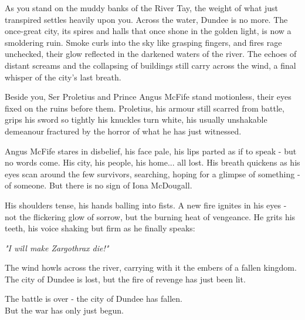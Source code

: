 \begin{DndReadAloud}
	As you stand on the muddy banks of the River Tay, the weight of what just transpired settles heavily upon you. Across the water, Dundee is no more. The once-great city, its spires and halls that once shone in the golden light, is now a smoldering ruin. Smoke curls into the sky like grasping fingers, and fires rage unchecked, their glow reflected in the darkened waters of the river. The echoes of distant screams and the collapsing of buildings still carry across the wind, a final whisper of the city's last breath.

	Beside you, Ser Proletius and Prince Angus McFife stand motionless, their eyes fixed on the ruins before them. Proletius, his armour still scarred from battle, grips his sword so tightly his knuckles turn white, his usually unshakable demeanour fractured by the horror of what he has just witnessed.

	Angus McFife stares in disbelief, his face pale, his lips parted as if to speak - but no words come. His city, his people, his home... all lost. His breath quickens as his eyes scan around the few survivors, searching, hoping for a glimpse of something - of someone. But there is no sign of Iona McDougall.

	His shoulders tense, his hands balling into fists. A new fire ignites in his eyes - not the flickering glow of sorrow, but the burning heat of vengeance. He grits his teeth, his voice shaking but firm as he finally speaks:

	\textit{"I will make Zargothrax die!"}

	The wind howls across the river, carrying with it the embers of a fallen kingdom. The city of Dundee is lost, but the fire of revenge has just been lit.
\end{DndReadAloud}

{\centering\entryfont The battle is over - the city of Dundee has fallen.\\But the war has only just begun.\\}

%

{\centering\contourlength{0.05em}\Large{}\\}